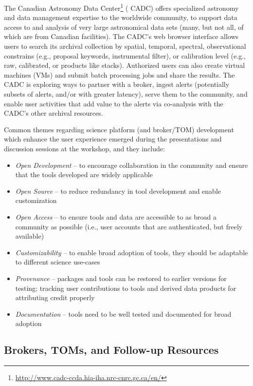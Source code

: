 The Canadian Astronomy Data  {Center}\footnote{\url{http://www.cadc-ccda.hia-iha.nrc-cnrc.gc.ca/en/}} ( {CADC}) offers specialized astronomy and data management expertise to the worldwide community, to support data access to and analysis of very large astronomical data sets (many, but not all, of which are from Canadian facilities).
The  {CADC}'s web browser interface allows users to search its archival collection by spatial, temporal, spectral, observational constrains (e.g., proposal keywords, instrumental filter), or  {calibration} level (e.g., raw, calibrated, or products like stacks).
Authorized users can also create virtual machines (VMs) and submit batch processing jobs and share the results.
The  {CADC} is exploring ways to partner with a broker, ingest alerts (potentially subsets of alerts, and/or with greater latency), serve them to the community, and enable user activities that add value to the alerts via co-analysis with the  {CADC}'s other archival resources.


Common themes regarding science platform (and broker/TOM) development which enhance the user experience emerged during the presentations and discussion sessions at the workshop, and they include:
\begin{itemize}
\item {\it Open Development} -- to encourage collaboration in the community and ensure that the tools developed are widely applicable
\item {\it Open  {Source}} -- to reduce redundancy in tool development and enable customization
\item {\it Open Access} -- to ensure tools and data are accessible to as broad a community as possible (i.e., user accounts that are authenticated, but freely available)
\item {\it Customizability} -- to enable broad adoption of tools, they should be adaptable to different science use-cases
\item {\it Provenance} -- packages and tools can be restored to earlier versions for testing; tracking user contributions to tools and derived data products for attributing credit properly
\item {\it Documentation} -- tools need to be well tested and documented for broad adoption
\end{itemize}

\subsection{Brokers, TOMs, and Follow-up Resources}\label{ssec:interfaces_brokers}

